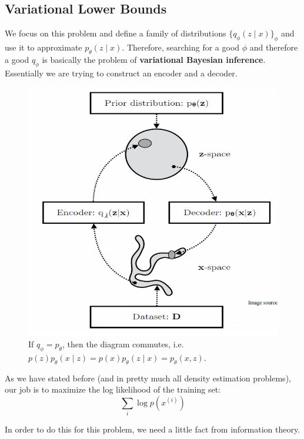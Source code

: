 \documentclass{article}
\begin{document}
\subsection{Variational Lower Bounds} 

  We focus on this problem and define a family of distributions $\{q_\phi (z \mid x)\}_\phi$ and use it to approximate $p_\theta (z \mid x)$. Therefore, searching for a good $\phi$ and therefore a good $q_\phi$ is basically the problem of \textbf{variational Bayesian inference}. Essentially we are trying to construct an encoder and a decoder.

  \begin{figure}[H]
    \centering 
    \includegraphics[scale=0.4]{img/latent_variable_model.png}
    \caption{If $q_{\phi} = p_{\theta}$, then the diagram commutes, i.e. $p(z) p_{\theta}(x \mid z) = p(x) p_{\theta}(z \mid x) = p_{\theta} (x, z)$.} 
    \label{fig:latent_variable_model}
  \end{figure}

  As we have stated before (and in pretty much all density estimation problems), our job is to maximize the log likelihood of the training set: 
  \begin{equation}
    \sum_{i} \log p(x^{(i)})
  \end{equation}

  In order to do this for this problem, we need a little fact from information theory. 
\end{document}
